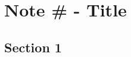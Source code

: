 \documentclass[10pt]{article}
\author{}
\date{}
\begin{document}
\section*{\centering Note \# - Title}

\subsection*{Section 1}
\end{document}
